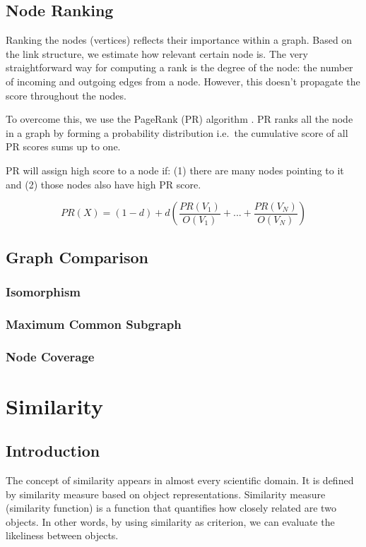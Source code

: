 \subsection{Node Ranking}
Ranking the nodes (vertices) reflects their importance within a graph. 
Based on the link structure, we estimate how relevant certain node is.
The very straightforward way for computing a rank is the degree of the node: the number of incoming and outgoing  edges from a node. However, this doesn’t propagate the score throughout the nodes.

To overcome this, we use the PageRank (PR) algorithm \cite{PageRank}. PR ranks all the node in a graph by forming a probability distribution i.e.\ the cumulative score of all PR scores sums up to one. 

PR will assign high score to a node if: (1) there are many nodes pointing to it and (2) those nodes also have high PR score.


\begin{equation}
	PR(X) = (1-d) + d(\dfrac{PR(V_{1})}{O(V_{1})} + ... + \dfrac{PR(V_{N})}{O(V_{N})})
\end{equation}

\subsection{Graph Comparison}
\subsubsection{Isomorphism}
\subsubsection{Maximum Common Subgraph}
\subsubsection{Node Coverage}

\section{Similarity}
\subsection{Introduction}
The concept of similarity appears in almost every scientific domain. It is defined by similarity measure based on object representations.
Similarity measure (similarity function) is a function that quantifies how closely related are two objects. 
In other words, by using similarity as criterion, we can evaluate the likeliness between objects. 


